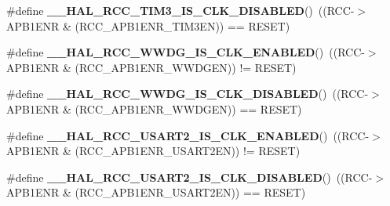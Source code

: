 \begin{DoxyCompactItemize}
\#define {\bfseries \+\_\+\+\_\+\+H\+A\+L\+\_\+\+R\+C\+C\+\_\+\+T\+I\+M3\+\_\+\+I\+S\+\_\+\+C\+L\+K\+\_\+\+D\+I\+S\+A\+B\+L\+ED}()~((R\+CC-\/$>$A\+P\+B1\+E\+NR \& (R\+C\+C\+\_\+\+A\+P\+B1\+E\+N\+R\+\_\+\+T\+I\+M3\+EN)) == R\+E\+S\+ET)
\item 
\mbox{\label{group___r_c_c___a_p_b1___peripheral___clock___enable___disable___status_ga9b26aff2638d1e0613b0ce0530f0cd48}} 
\#define {\bfseries \+\_\+\+\_\+\+H\+A\+L\+\_\+\+R\+C\+C\+\_\+\+W\+W\+D\+G\+\_\+\+I\+S\+\_\+\+C\+L\+K\+\_\+\+E\+N\+A\+B\+L\+ED}()~((R\+CC-\/$>$A\+P\+B1\+E\+NR \& (R\+C\+C\+\_\+\+A\+P\+B1\+E\+N\+R\+\_\+\+W\+W\+D\+G\+EN)) != R\+E\+S\+ET)
\item 
\mbox{\label{group___r_c_c___a_p_b1___peripheral___clock___enable___disable___status_ga21d4e081c859ddccd4492343743bb245}} 
\#define {\bfseries \+\_\+\+\_\+\+H\+A\+L\+\_\+\+R\+C\+C\+\_\+\+W\+W\+D\+G\+\_\+\+I\+S\+\_\+\+C\+L\+K\+\_\+\+D\+I\+S\+A\+B\+L\+ED}()~((R\+CC-\/$>$A\+P\+B1\+E\+NR \& (R\+C\+C\+\_\+\+A\+P\+B1\+E\+N\+R\+\_\+\+W\+W\+D\+G\+EN)) == R\+E\+S\+ET)
\item 
\mbox{\label{group___r_c_c___a_p_b1___peripheral___clock___enable___disable___status_gad3bbe0639658ed2cc56f8328b26373ea}} 
\#define {\bfseries \+\_\+\+\_\+\+H\+A\+L\+\_\+\+R\+C\+C\+\_\+\+U\+S\+A\+R\+T2\+\_\+\+I\+S\+\_\+\+C\+L\+K\+\_\+\+E\+N\+A\+B\+L\+ED}()~((R\+CC-\/$>$A\+P\+B1\+E\+NR \& (R\+C\+C\+\_\+\+A\+P\+B1\+E\+N\+R\+\_\+\+U\+S\+A\+R\+T2\+EN)) != R\+E\+S\+ET)
\item 
\mbox{\label{group___r_c_c___a_p_b1___peripheral___clock___enable___disable___status_ga61e4b1f3e82831cdc7508d4c38312eab}} 
\#define {\bfseries \+\_\+\+\_\+\+H\+A\+L\+\_\+\+R\+C\+C\+\_\+\+U\+S\+A\+R\+T2\+\_\+\+I\+S\+\_\+\+C\+L\+K\+\_\+\+D\+I\+S\+A\+B\+L\+ED}()~((R\+CC-\/$>$A\+P\+B1\+E\+NR \& (R\+C\+C\+\_\+\+A\+P\+B1\+E\+N\+R\+\_\+\+U\+S\+A\+R\+T2\+EN)) == R\+E\+S\+ET)
\item 
\mbox{\label{group___r_c_c___a_p_b1___peripheral___clock___enable___disable___status_ga7570e5654fd61b44dabe0546e524c906}} 

\end{DoxyCompactItemize}
